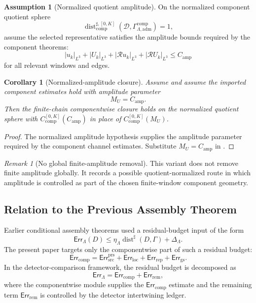 \documentclass[11pt]{article}
\numberwithin{equation}{section}
\newtheorem{corollary}[corollary]{Corollary}
\theoremstyle{definition}
\newtheorem{assumption}[assumption]{Assumption}
\theoremstyle{remark}
\newtheorem{remark}[remark]{Remark}
\newcommand{\adm}{\mathrm{adm}}
\newcommand{\prs}{\mathrm{prs}}
\newcommand{\src}{\mathrm{src}}
\newcommand{\rep}{\mathrm{rep}}
\newcommand{\gs}{\mathrm{gs}}
\newcommand{\locerr}{\mathrm{loc}}
\newcommand{\comp}{\mathrm{comp}}
\newcommand{\Err}{\mathsf{Err}}
\newcommand{\Dist}{\operatorname{dist}}
\newcommand{\calD}{\mathcal D}
\newcommand{\Gcomp}{\Gamma_{\Lambda,\adm}^{\comp}}
\begin{document}
\begin{assumption}[Normalized quotient amplitude]
\label{comp:ass:normalized-amplitude}
On the normalized component quotient sphere
\[
    \Dist_{\comp}^{\sharp,[0,K]}(\calD,\Gcomp)=1,
\]
assume the selected representative satisfies the amplitude bounds required by
the component theorems:
\[
    |u_k|_{L^3}
    +
    |U_k|_{L^3}
    +
    |\mathcal R u_k|_{L^3}
    +
    |\mathcal R U_k|_{L^3}
    \le
    C_{\mathrm{amp}}
\]
for all relevant windows and edges.
\end{assumption}

\begin{corollary}[Normalized-amplitude closure]
\label{comp:cor:normalized-amplitude-target}
Assume  and assume the imported component
estimates hold with amplitude parameter
\[
    M_U=C_{\mathrm{amp}}.
\]
Then the finite-chain componentwise closure holds on the normalized quotient
sphere with \(C_{\comp}^{[0,K]}(C_{\mathrm{amp}})\) in place of
\(C_{\comp}^{[0,K]}(M_U)\).
\end{corollary}

\begin{proof}
The normalized amplitude hypothesis supplies the amplitude parameter required
by the component channel estimates.  Substitute \(M_U=C_{\mathrm{amp}}\) in
.
\end{proof}

\begin{remark}[No global finite-amplitude removal]
This variant does not remove finite amplitude globally.  It records a possible
quotient-normalized route in which amplitude is controlled as part of the
chosen finite-window component geometry.
\end{remark}

\subsection{Relation to the Previous Assembly Theorem}
\label{comp:sec:assembly-relation}

Earlier conditional assembly theorems used a residual-budget input of the form
\[
    \Err_{\Lambda}(D)
    \le
    \eta_{\Lambda}
    \Dist^{\sharp}(D,\Gamma)
    +
    \Delta_{\Lambda}.
\]
The present paper targets only the componentwise part of such a residual
budget:
\[
    \Err_{\comp}
    =
    \Err_{\src}^{\prs}
    +
    \Err_{\locerr}
    +
    \Err_{\rep}
    +
    \Err_{\gs}.
\]
In the detector-comparison framework, the residual budget is decomposed as
\[
    \Err_{\Lambda}
    =
    \Err_{\comp}
    +
    \Err_{\mathrm{rem}},
\]
where the componentwise module supplies the \(\Err_{\comp}\) estimate and
the remaining term \(\Err_{\mathrm{rem}}\) is controlled by the detector
intertwining ledger.
\end{document}
